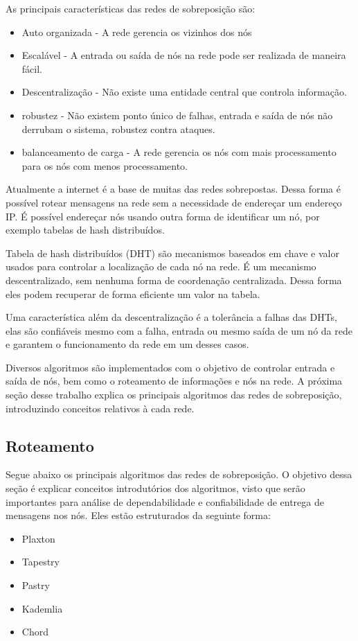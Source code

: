 As principais características das redes de sobreposição são:

\begin{itemize}
	\item Auto organizada - A rede gerencia os vizinhos dos nós
	\item Escalável - A entrada ou saída de nós na rede pode ser realizada de maneira fácil.
	\item Descentralização - Não existe uma entidade central que controla informação.
	\item robustez - Não existem ponto único de falhas, entrada e saída de nós não derrubam o sistema, robustez contra ataques.
	\item balanceamento de carga - A rede gerencia os nós com mais processamento para os nós com menos processamento.
\end{itemize}

Atualmente a internet é a base de muitas das redes sobrepostas. Dessa forma é possível rotear mensagens na rede sem a necessidade de endereçar um endereço IP. É possível endereçar nós usando outra forma de identificar um nó, por exemplo tabelas de hash distribuídos.

Tabela de hash distribuídos (DHT) são mecanismos baseados em chave e valor usados para controlar a localização de cada nó na rede. É um mecanismo descentralizado, sem nenhuma forma de coordenação centralizada. Dessa forma eles podem recuperar de forma eficiente um valor na tabela.

Uma característica além da descentralização é a tolerância a falhas das DHTs, elas são confiáveis mesmo com a falha, entrada ou mesmo saída de um nó da rede e garantem o funcionamento da rede em um desses casos.

Diversos algoritmos são implementados com o objetivo de controlar entrada e saída de nós, bem como o roteamento de informações e nós na rede. A próxima seção desse trabalho explica os principais algoritmos das redes de sobreposição, introduzindo conceitos relativos à cada rede.

\subsection{Roteamento}

Segue abaixo os principais algoritmos das redes de sobreposição. O objetivo dessa seção é explicar conceitos introdutórios dos algoritmos, visto que serão importantes para análise de dependabilidade e confiabilidade de entrega de mensagens nos nós. Eles estão estruturados da seguinte forma:
\begin{itemize}
	\item Plaxton
	\item Tapestry
	\item Pastry
	\item Kademlia
	\item Chord
\end{itemize}

